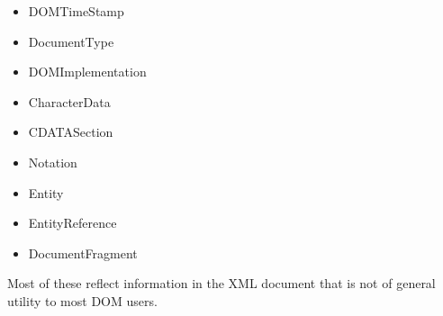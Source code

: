 \begin{itemize}

\item DOMTimeStamp

\item DocumentType

\item DOMImplementation

\item CharacterData

\item CDATASection

\item Notation

\item Entity

\item EntityReference

\item DocumentFragment

\end{itemize}

Most of these reflect information in the XML document that is not of
general utility to most DOM users.
